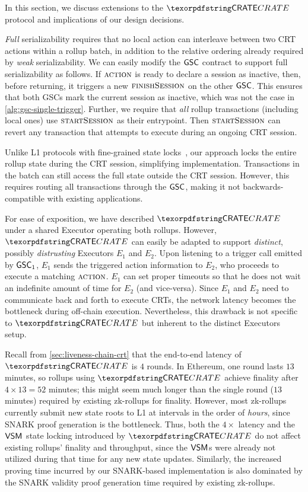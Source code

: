 In this section, we discuss extensions to the $\pname$ protocol and implications of our design decisions.




\emph{Full} serializability requires that no local action can interleave between two CRT actions within a rollup batch, in addition to the relative ordering already required by \emph{weak} serializability. We can easily modify the $\mathsf{GSC}$ contract to support full serializability as follows. If $\action$ is ready to declare a session as inactive, then, before returning, it triggers a new $\textproc{finishSession}$ on the other $\mathsf{GSC}$. This ensures that both GSCs mark the current session as inactive, which was not the case in \cref{alg:gsc-single-trigger}. Further, we require that \emph{all} rollup transactions (including local ones) use $\startsession$ as their entrypoint. Then $\startsession$ can revert any transaction that attempts to execute during an ongoing CRT session. 


Unlike L1 protocols with fine-grained state locks~\cite{fal-tccsci-23}, our approach locks the entire rollup state during the CRT session, simplifying implementation. Transactions in the batch can still access the full state outside the CRT session. However, this requires routing all transactions through the $\mathsf{GSC}$, making it not backwards-compatible with existing applications.




For ease of exposition, we have described $\pname$ under a shared Executor operating both rollups. However, $\pname$ can easily be adapted to support \emph{distinct}, possibly \emph{distrusting} Executors $E_1$ and $E_2$. Upon listening to a trigger call emitted by $\mathsf{GSC}_1$, $E_1$ sends the triggered action information to $E_2$, who proceeds to execute a matching $\action$. $E_1$ can set proper timeouts so that he does not wait an indefinite amount of time for $E_2$ (and vice-versa). Since $E_1$ and $E_2$ need to communicate back and forth to execute CRTs, the network latency becomes the bottleneck during off-chain execution. Nevertheless, this drawback is not specific to $\pname$ but inherent to the distinct Executors setup.




Recall from \cref{sec:liveness-chain-crt} that the end-to-end latency of $\pname$ is $4$ rounds. In Ethereum, one round lasts $13$ minutes, so rollups using $\pname$ achieve finality after $4 \times 13 = 52$ minutes; this might seem much longer than the single round ($13$ minutes) required by existing zk-rollups for finality. However, most zk-rollups currently submit new state roots to L1 at intervals in the order of \emph{hours}, since SNARK proof generation is the bottleneck. Thus, both the $4\times$ latency and the $\mathsf{VSM}_{}$ state locking introduced by $\pname$ do not affect existing rollups' finality and throughput, since the $\mathsf{VSM}_{}$s were already not utilized during that time for any new state updates. Similarly, the increased proving time incurred by our SNARK-based implementation is also dominated by the SNARK validity proof generation time required by existing zk-rollups.

